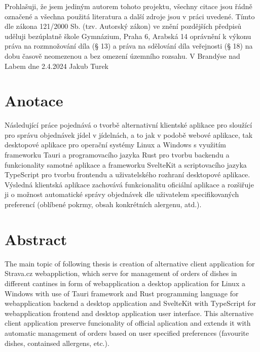 \documentclass[12pt]{article}
\begin{document}
\graphicspath{{./pictures/}}
\renewcommand*\contentsname{Obsah}
\renewcommand{\bibfont}{\small}
\renewcommand{\thesection}{\Roman{section}} 
\renewcommand{\thesubsection}{\thesection.\Roman{subsection}}
\renewcommand{\thesubsubsection}{\thesubsection.\Roman{subsubsection}}
\renewcommand\listoflistingscaption{Seznam příloh}
\renewcommand{\listingscaption}{Příloha}
\addtolength{\cftsecnumwidth}{2pt}
\addtolength{\cftsubsecnumwidth}{10pt}
\addtolength{\cftsubsubsecnumwidth}{12pt}

\newpage{}
\thispagestyle{empty}
\mbox{}
\vfill
Prohlašuji, že jsem jediným autorem tohoto projektu, všechny citace jsou řádně označené a všechna použitá literatura a další zdroje jsou v práci uvedené. Tímto dle zákona 121/2000 Sb. (tzv. Autorský zákon) ve znění pozdějších předpisů uděluji bezúplatně škole Gymnázium, Praha 6, Arabská 14
oprávnění k výkonu práva na rozmnožování díla (§ 13) a práva na sdělování díla veřejnosti (§ 18) na dobu časově neomezenou a bez omezení územního rozsahu.
\newline
V Brandýse nad Labem dne 2.4.2024 \hfill Jakub Turek
\newpage{}
\thispagestyle{empty}
\section*{Anotace}
Následující práce pojednává o tvorbě alternativní klientské aplikace pro sloužící pro správu objednávek jídel v jídelnách, a to jak v podobě webové aplikace, tak desktopové aplikace pro operační systémy Linux a Windows s využitím frameworku Tauri a programovacího jazyka Rust pro tvorbu backendu a funkcionality samotné aplikace a frameworku SvelteKit a scriptovacího jazyka TypeScript pro tvorbu frontendu a uživatelského rozhraní desktopové aplikace. Výsledná klientská aplikace zachovává funkcionalitu oficiální aplikace a rozšiřuje ji o možnost automatické správy objednávek dle uživatelem specifikovaných preferencí (oblíbené pokrmy, obsah konkrétních alergenu, atd.). 
\section*{Abstract}
The main topic of following thesis is creation of alternative client application for Strava.cz webappliction, which serve for management of orders of dishes in different cantines in form of webapplication a desktop application for Linux a Windows with use of Tauri framework and Rust programming language for webapplication backend a desktop application and SvelteKit with TypeScript for webapplication frontend and desktop application user interface. This alternative client application preserve funcionality of official aplication and extends it with automatic management of orders based on user specified preferences (favourite dishes, containsed allergens, etc.).
\newpage
\setcounter{page}{1} 
\renewcommand{\baselinestretch}{1.4}\normalsize
\tableofcontents 
\renewcommand{\baselinestretch}{1.5}\normalsize
\newpage
\end{document}

